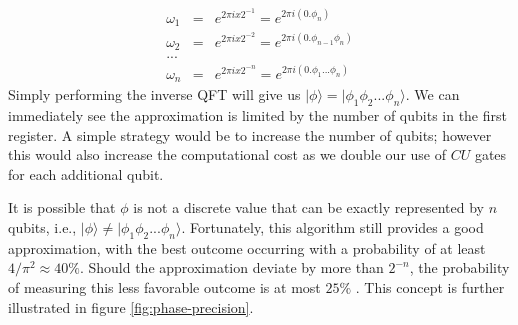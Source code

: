 \documentclass[msc,oneside]{ubcthesis}
\begin{document}
	\begin{eqnarray*}
		\omega_1 &=& e^{2\pi i x 2^{-1}} =  e^{2\pi i (0.\phi_n)}\\
		\omega_2 &=& e^{2\pi i x 2^{-2}} =  e^{2\pi i (0.\phi_{n-1}\phi_n)}\\
		...\\
		\omega_n &=& e^{2\pi i x 2^{-n}} =  e^{2\pi i (0.\phi_1...\phi_n)}
	\end{eqnarray*}
	Simply performing the inverse QFT will give us $|\phi\rangle =  |\phi_1\phi_2 ... \phi_n\rangle$.  We can immediately see the approximation is limited by the number of qubits in the first register. A simple strategy would be to increase the number of qubits; however this would also increase the computational cost as we double our use of $CU$ gates for each additional qubit.
	
	It is possible that $\phi$ is not a discrete value that can be exactly represented by $n$ qubits, i.e., $|\phi\rangle \neq |\phi_1\phi_2 ... \phi_n\rangle$. Fortunately, this algorithm still provides a good approximation, with the best outcome occurring with a probability of at least $4/{\pi^2} \approx 40\%$. Should the approximation deviate by more than $2^{-n}$, the probability of measuring this less favorable outcome is at most $25\%$ \cite{Phase-estimation}. This concept is further illustrated in figure \ref{fig:phase-precision}.
	
\end{document}
